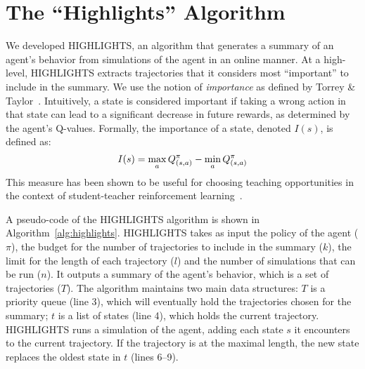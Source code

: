 \section{The ``Highlights'' Algorithm}
\label{sec:alg}
We developed HIGHLIGHTS, an algorithm that generates a summary of an agent's behavior from simulations of the agent in an online manner. At a high-level, HIGHLIGHTS extracts trajectories that it considers most ``important'' to include in the summary. We use the notion of \emph{importance} as defined by Torrey \& Taylor~.  Intuitively, a state is considered important if taking a wrong action in that state can lead to a significant decrease in future rewards, as determined by the agent's Q-values. Formally, the importance of a state, denoted $I(s)$, is defined as: 
\begin{equation}
\label{eq:importance}
I(s)=\max\limits_{a}Q^{\pi}_{(s,a)}-\min\limits_{a}Q^{\pi}_{(s,a)}
\vspace{-0.1cm}
\end{equation}
 This measure has been shown to be useful for choosing teaching opportunities in the context of student-teacher reinforcement learning~\cite{torrey2013teaching,amirIjcaiRL}.



A pseudo-code of the HIGHLIGHTS algorithm is  shown in Algorithm~\ref{alg:highlights}. HIGHLIGHTS takes as input the policy of the agent ($\pi$), the budget for the number of trajectories to include in the summary ($k$), the limit for the length of each trajectory ($l$) and the number of simulations that can be run ($n$). It outputs a summary of the agent's behavior, which is a set of trajectories ($T$). 
The algorithm maintains two main data structures: $T$ is a priority queue (line 3), which will eventually hold the trajectories chosen for the summary; $t$ is a list of states (line 4), which holds the current trajectory. HIGHLIGHTS runs a simulation of the agent, adding each state $s$ it encounters to the current trajectory. If the trajectory is at the maximal length, the new state replaces the oldest state in $t$ (lines 6--9). 


